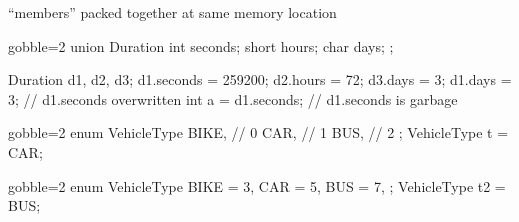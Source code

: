 \begin{frame}[fragile]
  \begin{mdframed}[style=simplebox]
    \center ``members'' packed together at same memory location
  \end{mdframed}
  \begin{multicols}{2}
    \begin{cppcode*}{gobble=2}
      union Duration {
        int seconds;
        short hours;
        char days;
      };

      Duration d1, d2, d3;
      d1.seconds = 259200;
      d2.hours = 72;
      d3.days = 3;
      d1.days = 3; // d1.seconds overwritten
      int a = d1.seconds; // d1.seconds is garbage
    \end{cppcode*}
    \pause
    \columnbreak
    \null \vfill
    \vfill \null
  \end{multicols}
\end{frame}

\begin{frame}[fragile]
  \begin{multicols}{2}
    \begin{cppcode*}{gobble=2}
      enum VehicleType {
        BIKE,  // 0
        CAR,   // 1
        BUS,   // 2
      };
      VehicleType t = CAR;
    \end{cppcode*}
    \columnbreak
    \begin{cppcode*}{gobble=2}
      enum VehicleType {
        BIKE = 3,
        CAR = 5,
        BUS = 7,
      };
      VehicleType t2 = BUS;
    \end{cppcode*}
  \end{multicols}
\end{frame}

